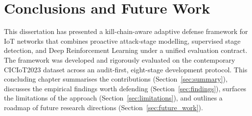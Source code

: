 \clearpage
\chapter{Conclusions and Future Work}\label{cap:conclusion}

This dissertation has presented a kill-chain-aware adaptive defense framework for IoT networks that combines proactive attack-stage modelling, supervised stage detection, and Deep Reinforcement Learning under a unified evaluation contract. The framework was developed and rigorously evaluated on the contemporary CICIoT2023 dataset across an audit-first, eight-stage development protocol. This concluding chapter summarises the contributions (Section~\ref{sec:summary}), discusses the empirical findings worth defending (Section~\ref{sec:findings}), surfaces the limitations of the approach (Section~\ref{sec:limitations}), and outlines a roadmap of future research directions (Section~\ref{sec:future_work}).

